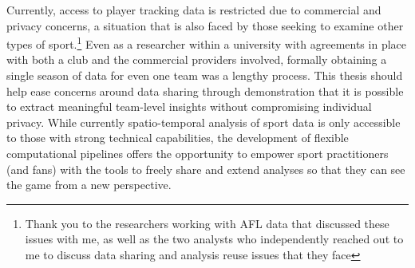 Currently, access to \afl{} player tracking data is restricted due to commercial and privacy concerns, a situation that is also faced by those seeking to examine other types of sport.\footnote{Thank you to the researchers working with AFL data that discussed these issues with me, as well as the two \soccer{} analysts who independently reached out to me to discuss data sharing and analysis reuse issues that they face} Even as a researcher within a university with agreements in place with both a club and the commercial providers involved, formally obtaining a single season of data for even one team was a lengthy process. This thesis should help ease concerns around data sharing through demonstration that it is possible to extract meaningful team-level insights without compromising individual privacy. While currently spatio-temporal analysis of sport data is only accessible to those with strong technical capabilities, the development of flexible computational pipelines offers the opportunity to empower sport practitioners (and fans) with the tools to freely share and extend analyses so that they can see the game from a new perspective.
